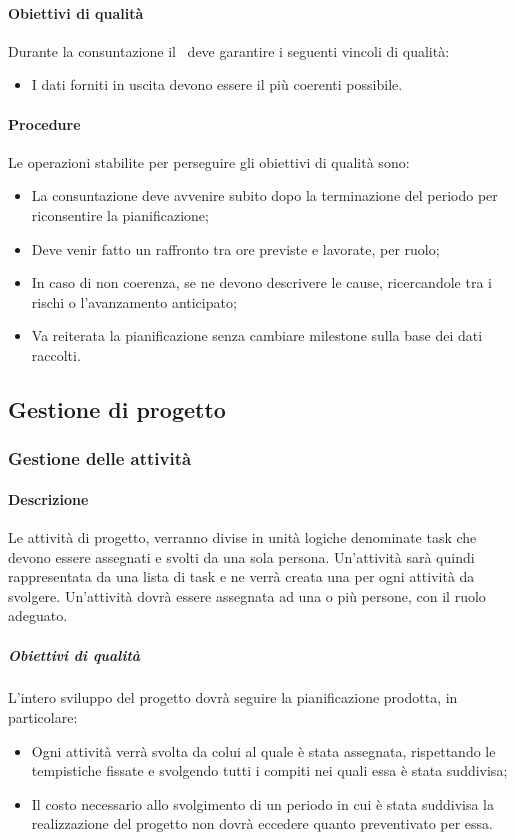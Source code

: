 \documentclass[../NormeDiProgetto_v3.0.0.tex]{subfiles}
\begin{document}
			\paragraph{Obiettivi di qualità}
				Durante la consuntazione il \responsabilediprogetto\ deve garantire i seguenti vincoli di qualità: 
				\begin{itemize}
					\item I dati forniti in uscita devono essere il più coerenti possibile.
				\end{itemize}
			\paragraph{Procedure}
				Le operazioni stabilite per perseguire gli obiettivi di qualità sono:
				\begin{itemize}
					\item La consuntazione deve avvenire subito dopo la terminazione del periodo per riconsentire la pianificazione;
					\item Deve venir fatto un raffronto tra ore previste e lavorate, per ruolo;
					\item In caso di non coerenza, se ne devono descrivere le cause, ricercandole tra i rischi o l'avanzamento anticipato;	
					\item Va reiterata la pianificazione senza cambiare milestone sulla base dei dati raccolti.
				\end{itemize}


	\subsection{Gestione di progetto}

		\subsubsection{Gestione delle attività}
			\paragraph{Descrizione}
			Le attività di progetto, verranno divise in unità logiche denominate task che devono essere assegnati e svolti da una sola persona. 
			Un'attività sarà quindi rappresentata da una lista di task e ne verrà creata una per ogni attività da svolgere.
			Un'attività dovrà essere assegnata ad una o più persone, con il ruolo adeguato.

			\subparagraph{Obiettivi di qualità}
			L'intero sviluppo del progetto dovrà seguire la pianificazione prodotta, in particolare:
			\begin{itemize}
				\item Ogni attività verrà svolta da colui al quale è stata assegnata, rispettando le tempistiche fissate e svolgendo tutti i compiti nei quali essa è stata suddivisa;
				\item Il costo necessario allo svolgimento di un periodo in cui è stata suddivisa la realizzazione del progetto non dovrà eccedere quanto preventivato per essa.
			\end{itemize}
	
\end{document}
